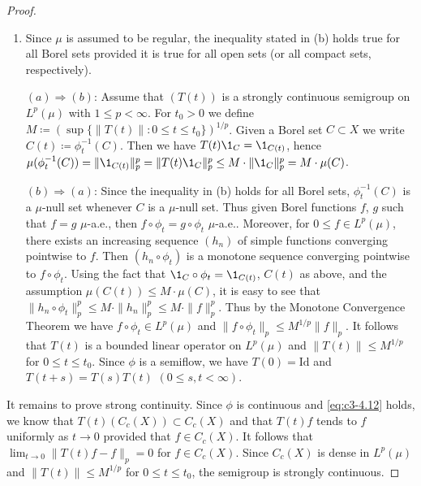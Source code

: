 \begin{proof}
\begin{enumerate}[\upshape (i), wide, labelindent=.5em]
\item
Since $\mu$ is assumed to be regular, the inequality stated in (b) holds true for all Borel sets provided it is true for all open sets (or all compact sets, respectively).
\end{enumerate}

\begin{enumerate}[wide, labelindent=.5em]

\item[$(a)\Rightarrow(b)$:] 
Assume that $(T(t))$ is a strongly continuous semigroup on
$L^p(\mu)$ with $1 \leq p < \infty$. For $t_0 > 0$ we define $M \coloneqq  (\sup\{\|T(t)\| \colon 0 \leq t \leq t_0\})^{1/p}$.
Given a Borel set $C \subset X$ we write $C(t) \coloneqq  \phi_t^{-1}(C)$.
Then we have $T(t)\1_C = \1_{C(t)}$, hence
$\mu(\phi_t^{-1}(C)) = \|\1_{C(t)}\|_p^p = \|T(t)\1_C\|_p^p \leq M \cdot \|\1_C\|_p^p = M \cdot \mu(C)$.

\item[$(b)\Rightarrow(a)$:] 
Since the inequality in (b) holds for all Borel sets,
$\phi_t^{-1}(C)$ is a $\mu$-null set whenever $C$ is a $\mu$-null set. 
Thus given
Borel functions $f$, $g$ such that $f = g$ $\mu$-a.e., then $f \circ \phi_t = g \circ \phi_t$
$\mu$-a.e.. 
Moreover, for $0 \leq f \in L^p(\mu)$, there exists an increasing
sequence $(h_n)$ of simple functions converging pointwise to $f$. Then
$(h_n \circ \phi_t)$ is a monotone sequence converging pointwise to $f \circ \phi_t$. Using
the fact that $\1_C \circ \phi_t = \1_{C(t)}$, $C(t)$ as above, and the assumption
$\mu(C(t)) \leq M \cdot \mu(C)$, it is easy to see that $\|h_n \circ \phi_t\|_p^p \leq M \cdot \|h_n\|_p^p \leq M \cdot \|f\|_p^p$.
Thus by the Monotone Convergence Theorem we have $f \circ \phi_t \in L^p(\mu)$ and
$\|f \circ \phi_t\|_p \leq M^{1/p}\|f\|_p$. It follows that $T(t)$ is a bounded linear
operator on $L^p(\mu)$ and $\|T(t)\| \leq M^{1/p}$ for $0 \leq t \leq t_0$. Since $\phi$ is a
semiflow, we have $T(0) = \text{Id}$ and $T(t+s) = T(s)T(t)$ $(0 \leq s,t < \infty)$. 
\end{enumerate}
It remains to prove strong continuity. Since $\phi$ is continuous and \eqref{eq:c3-4.12}
holds, we know that $T(t)(C_c(X)) \subset C_c(X)$ and that $T(t)f$ tends to $f$
uniformly as $t \to 0$ provided that $f \in C_c(X)$. It follows that
$\lim_{t \to 0}\|T(t)f - f\|_p = 0$ for $f \in C_c(X)$. Since $C_c(X)$ is dense in
$L^p(\mu)$ and $\|T(t)\| \leq M^{1/p}$ for $0 \leq t \leq t_0$, the semigroup is strongly
continuous.


\end{proof}
